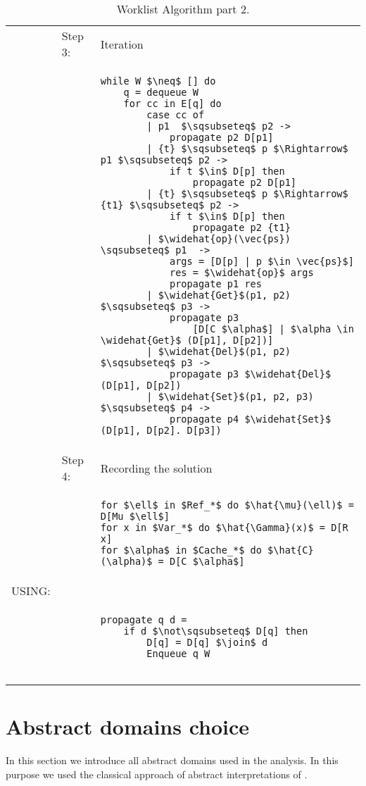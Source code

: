 \begin{table}[htb]
\small
\begin{center}
\begin{tabular}{l l l}
&Step 3: & Iteration\\
&&
\begin{lstlisting}[mathescape]
while W $\neq$ [] do
    q = dequeue W
    for cc in E[q] do
        case cc of
        | p1  $\sqsubseteq$ p2 -> 
            propagate p2 D[p1]
        | {t} $\sqsubseteq$ p $\Rightarrow$ p1 $\sqsubseteq$ p2 -> 
            if t $\in$ D[p] then
                propagate p2 D[p1]
        | {t} $\sqsubseteq$ p $\Rightarrow$ {t1} $\sqsubseteq$ p2 ->
            if t $\in$ D[p] then
                propagate p2 {t1}
        | $\widehat{op}(\vec{ps}) \sqsubseteq$ p1  -> 
            args = [D[p] | p $\in \vec{ps}$]
            res = $\widehat{op}$ args
            propagate p1 res
        | $\widehat{Get}$(p1, p2) $\sqsubseteq$ p3 -> 
            propagate p3 
                [D[C $\alpha$] | $\alpha \in \widehat{Get}$ (D[p1], D[p2])]
        | $\widehat{Del}$(p1, p2) $\sqsubseteq$ p3 -> 
            propagate p3 $\widehat{Del}$ (D[p1], D[p2]) 
        | $\widehat{Set}$(p1, p2, p3) $\sqsubseteq$ p4 -> 
            propagate p4 $\widehat{Set}$ (D[p1], D[p2]. D[p3]) 
\end{lstlisting}\\
& Step 4: & Recording the solution\\
&&
\begin{lstlisting}[mathescape]
for $\ell$ in $Ref_*$ do $\hat{\mu}(\ell)$ = D[Mu $\ell$]
for x in $Var_*$ do $\hat{\Gamma}(x)$ = D[R x]
for $\alpha$ in $Cache_*$ do $\hat{C}(\alpha)$ = D[C $\alpha$]
\end{lstlisting}\\
USING: \\
&&
\begin{lstlisting}[mathescape]
propagate q d =
    if d $\not\sqsubseteq$ D[q] then
        D[q] = D[q] $\join$ d
        Enqueue q W
    
\end{lstlisting}\\
\end{tabular}
\end{center}
\caption{Worklist Algorithm part 2.}
\label{tab:Worklist2}
\end{table}

\section{Abstract domains choice}
\label{sec:AbstractDomChoice}
In this section we introduce all abstract domains used in the analysis. In this purpose we used the classical approach of abstract interpretations of \cite{StringAbstraction, PrincipleProgramAnalysis}. %

